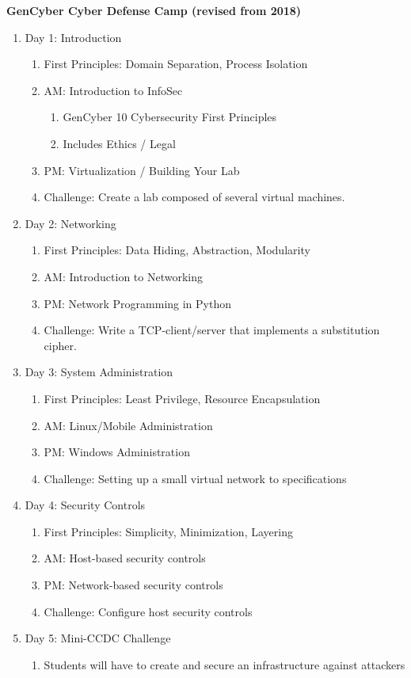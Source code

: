 \documentclass[12pt]{article}
\begin{document}
\vspace{5mm}

\textbf{GenCyber Cyber Defense Camp (revised from 2018)}

\begin{enumerate}[noitemsep]
	\item Day 1: Introduction
	\begin{enumerate}[noitemsep]
		\item First Principles: Domain Separation, Process Isolation
		\item AM: Introduction to InfoSec
		\begin{enumerate}[noitemsep]			\item GenCyber 10 Cybersecurity First Principles 
			\item Includes Ethics / Legal
		\end{enumerate}		\item PM: Virtualization / Building Your Lab		\item Challenge: Create a lab composed of several virtual machines.
	\end{enumerate}	\item Day 2: Networking
	\begin{enumerate}[noitemsep]		\item First Principles: Data Hiding, Abstraction, Modularity
		\item AM: Introduction to Networking		\item PM: Network Programming in Python		\item Challenge: Write a TCP-client/server that implements a substitution cipher.
	\end{enumerate}	\item Day 3: System Administration
	\begin{enumerate}[noitemsep]		\item First Principles: Least Privilege, Resource Encapsulation		\item AM: Linux/Mobile Administration		\item PM: Windows Administration		\item Challenge: Setting up a small virtual network to specifications
	\end{enumerate}	\item Day 4: Security Controls
	\begin{enumerate}[noitemsep]		\item First Principles: Simplicity, Minimization, Layering
		\item AM: Host-based security controls
		\item PM: Network-based security controls		\item Challenge: Configure host security controls
	\end{enumerate}	\item Day 5: Mini-CCDC Challenge
	\begin{enumerate}[noitemsep]		\item Students will have to create and secure an infrastructure against attackers
	\end{enumerate}
	

\end{enumerate}
\end{document}
